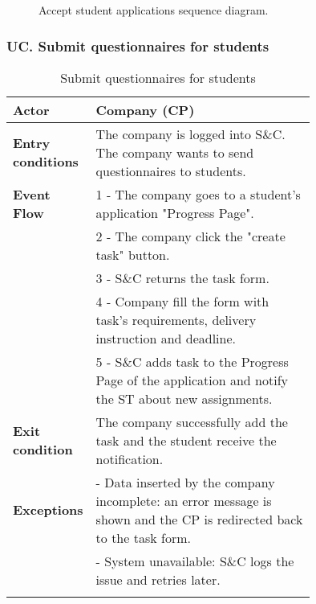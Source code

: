 \begin{figure}[H]
    \begin{center}
        
        \caption{Accept student applications sequence diagram.}
        \label{fig:accept_student_applications_seqd}%
    \end{center}
\end{figure}

\subsubsection*{UC\cuc . Submit questionnaires for students}
\begin{center}
    \begin{longtable}{|l|p{0.75\linewidth}|}
        \hline
        \textbf{Actor}            & Company (CP)\\
        \hline
        \textbf{Entry conditions} & The company is logged into S\&C. The company wants to send questionnaires to students.\\
        \hline
        \textbf{Event Flow}     & 1 - The company goes to a student’s application "Progress Page". \\
                                & 2 - The company click the "create task" button. \\
                                & 3 - S\&C returns the task form.\\
                                & 4 - Company fill the form with task’s requirements, delivery instruction and deadline.\\
                                & 5 -  S\&C adds task to the Progress Page of the application and notify the ST about new assignments.\\
        \hline
        \textbf{Exit condition}     & The company successfully add the task and the student receive the notification.\\       
        \hline
        \textbf{Exceptions}     & - Data inserted by the company incomplete: an error message is shown and the CP is redirected back to the task form. \\
                                & - System unavailable: S\&C logs the issue and retries later. \\
        \hline
        \caption{Submit questionnaires for students}
        \label{tab: submit_questionnaires_for_students_usecase}
    \end{longtable}
\end{center}

